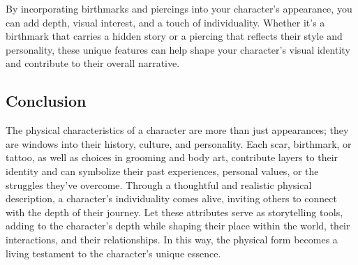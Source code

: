 By incorporating birthmarks and piercings into your character's appearance, you can add depth, visual interest, and a touch of individuality. Whether it's a birthmark that carries a hidden story or a piercing that reflects their style and personality, these unique features can help shape your character's visual identity and contribute to their overall narrative.

\subsection{\textbf{Conclusion}}

The physical characteristics of a character are more than just appearances; they are windows into their history, culture, and personality. Each scar, birthmark, or tattoo, as well as choices in grooming and body art, contribute layers to their identity and can symbolize their past experiences, personal values, or the struggles they’ve overcome. Through a thoughtful and realistic physical description, a character’s individuality comes alive, inviting others to connect with the depth of their journey. Let these attributes serve as storytelling tools, adding to the character’s depth while shaping their place within the world, their interactions, and their relationships. In this way, the physical form becomes a living testament to the character's unique essence.

